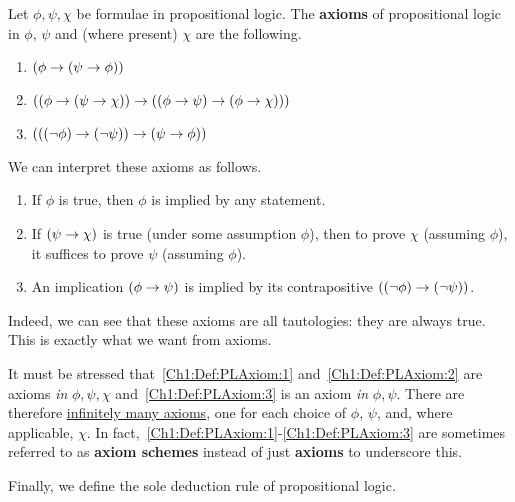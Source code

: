 \begin{boxdefinition}\label{Ch1:Def:FormalPropAxioms}
    Let $\phi, \psi, \chi$ be formulae in propositional logic. The \textbf{axioms} of propositional logic in $\phi$, $\psi$ and (where present) $\chi$ are the following.
    \begin{enumerate}[label = (A\arabic*)]
        \item\label{Ch1:Def:PLAxiom:1} $\left( \phi \to \left( \psi \to \phi \right) \right)$
        \item\label{Ch1:Def:PLAxiom:2} $\left( \left( \phi \to \left( \psi \to \chi \right) \right) \to \left( \left( \phi \to \psi \right) \to \left( \phi \to \chi \right) \right) \right)$
        \item\label{Ch1:Def:PLAxiom:3} $\left( \left( \left( \neg \phi \right) \to \left( \neg \psi \right) \right) \to \left( \psi \to \phi \right) \right)$
    \end{enumerate}
\end{boxdefinition}

We can interpret these axioms as follows.
\begin{enumerate}[label =~\ref{Ch1:Def:PLAxiom:\arabic*}, noitemsep]
    \item If $\phi$ is true, then $\phi$ is implied by any statement.
    \item If $\left( \psi \to \chi \right)$ is true (under some assumption $\phi$), then to prove $\chi$ (assuming $\phi$), it suffices to prove $\psi$ (assuming $\phi$).
    \item An implication $\left( \phi \to \psi \right)$ is implied by its contrapositive $\left( \left( \neg \phi \right) \to \left( \neg \psi \right) \right)$.
\end{enumerate}
Indeed, we can see that these axioms are all tautologies: they are always true. This is exactly what we want from axioms.

\begin{remark}
    It must be stressed that~\ref{Ch1:Def:PLAxiom:1} and~\ref{Ch1:Def:PLAxiom:2} are axioms \textit{in} $\phi, \psi, \chi$ and~\ref{Ch1:Def:PLAxiom:3} is an axiom \textit{in} $\phi, \psi$. There are therefore \underline{infinitely many axioms}, one for each choice of $\phi$, $\psi$, and, where applicable, $\chi$. In fact,~\ref{Ch1:Def:PLAxiom:1}-\ref{Ch1:Def:PLAxiom:3} are sometimes referred to as \textbf{axiom schemes} instead of just \textbf{axioms} to underscore this.
\end{remark}

Finally, we define the sole deduction rule of propositional logic.

